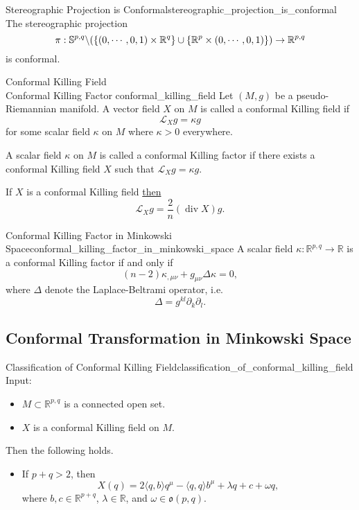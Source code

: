 \documentclass{article}
\begin{document}
\begin{example}{Stereographic Projection is Conformal}{stereographic_projection_is_conformal}
    The stereographic projection
    \[ \pi:\mathbb{S}^{p,q} \backslash\qty(\qty{(0,\cdots,0,1)\times \mathbb{R}^q} \cup \qty{\mathbb{R}^p\times (0,\cdots,0,1)}) \rightarrow \mathbb{R}^{p,q} \]
    is conformal.
\end{example}

\begin{definition}{Conformal Killing Field  \\ Conformal Killing Factor }{conformal_killing_field}
    Let $(M,g)$ be a pseudo-Riemannian manifold.
    A vector field $X$ on $M$ is called a conformal Killing field if
    \[ \mathcal{L}_X g = \kappa g \]
    for some scalar field $\kappa$ on $M$ where $\kappa > 0$ everywhere.
    \par
    A scalar field $\kappa$ on $M$ is called a conformal Killing factor if there exists a conformal Killing field $X$ such that $\mathcal{L}_X g = \kappa g$.
\end{definition}

If $X$ is a conformal Killing field \href{https://en.wikipedia.org/wiki/Conformal_Killing_vector_field}{then} 
\[ \mathcal{L}_X g = \frac{2}{n}(\operatorname{div} X) g. \]

\begin{theorem}{Conformal Killing Factor in Minkowski Space}{conformal_killing_factor_in_minkowski_space}
    A scalar field $\kappa: \mathbb{R}^{p,q}\rightarrow \mathbb{R}$ is a conformal Killing factor if and only if
    \[ (n-2) \kappa_{,\mu\nu} + g_{\mu\nu} \Delta \kappa = 0, \]
    where $\Delta$ denote the Laplace-Beltrami operator, i.e.
    \[ \Delta = g^{kl}\partial_k \partial_l. \]
\end{theorem}

\subsection{Conformal Transformation in Minkowski Space}

\begin{theorem}{Classification of Conformal Killing Field}{classification_of_conformal_killing_field}
    Input:
    \begin{itemize}
        \item $M\subset \mathbb{R}^{p,q}$ is a connected open set.
        \item $X$ is a conformal Killing field on $M$.
    \end{itemize}
    Then the following holds.
    \begin{itemize}
        \item If $p+q>2$, then
        \[ X(q) = 2 \langle q, b\rangle q^\mu - \langle q, q \rangle b^\mu + \lambda q + c + \omega q, \]
        where $b,c\in \mathbb{R}^{p+q}$, $\lambda\in\mathbb{R}$, and $\omega \in \mathfrak{o}(p,q)$.
    \end{itemize}
\end{theorem}
\end{document}
